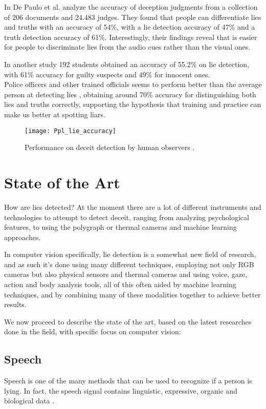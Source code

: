 In \cite{BondDePauloAccuracy} De Paulo et al. analyze the accuracy of deception judgments from a collection of 206 documents and 24.483 judges. They found that people can differentiate lies and truths with an accuracy of 54\%, with a lie detection accuracy of 47\% and a truth detection accuracy of 61\%. Interestingly, their findings reveal that is easier for people to discriminate lies from the audio cues rather than the visual ones.

In another study \cite{HartwigGranhag} 192 students obtained an accuracy of 55.2\% on lie detection, with 61\% accuracy for guilty suspects and 49\% for innocent ones.\\
Police officers and other trained officials seems to perform better than the average person at detecting lies  \cite{VrijPoliceDetect}, obtaining around 70\% accuracy for distinguishing both lies and truths correctly, supporting the hypothesis that training and practice can make us better at spotting liars.

\begin{figure}[H]
	\centering
	\texttt{[image: Ppl\_lie\_accuracy]}
	\caption{Performance on deceit detection by human observers \cite{SU201652}.}
\end{figure}
 
\clearpage

\section{State of the Art} \label{sota}
How are lies detected? At the moment there are a lot of different instruments and technologies to attempt to detect deceit, ranging from analyzing psychological features, to using the polygraph or thermal cameras and machine learning approaches.

In computer vision specifically, lie detection is a somewhat new field of research, and as such it's done using many different techniques, employing not only RGB cameras but also physical sensors and thermal cameras and using voice, gaze, action and body analysis tools, all of this often aided by machine learning techniques, and by combining many of these modalities together to achieve better results.

We now proceed to describe the state of the art, based on the latest researches done in the field, with specific focus on computer vision:

\subsection{Speech}
Speech is one of the many methods that can be used to recognize if a person is lying. In fact, the speech signal contains linguistic, expressive, organic and biological data \cite{norena}.

